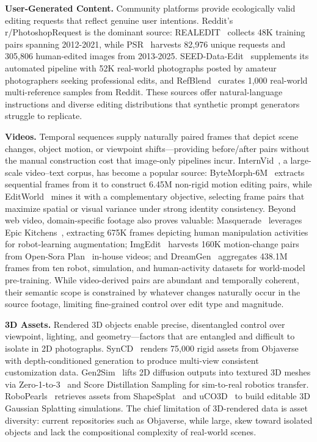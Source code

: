 \documentclass{llmxive}
\begin{document}
\textbf{User-Generated Content.}
Community platforms provide ecologically valid editing requests that reflect genuine user intentions. Reddit's r/PhotoshopRequest is the dominant source: REALEDIT~\citep{sushko2025realedit} collects 48K training pairs spanning 2012-2021, while PSR~\citep{taesiri2025understanding} harvests 82,976 unique requests and 305,806 human-edited images from 2013-2025. SEED-Data-Edit~\citep{ge2024seed} supplements its automated pipeline with 52K real-world photographs posted by amateur photographers seeking professional edits, and RefBlend~\citep{chen2025multiref} curates 1,000 real-world multi-reference samples from Reddit. These sources offer natural-language instructions and diverse editing distributions that synthetic prompt generators struggle to replicate.

\textbf{Videos.}
Temporal sequences supply naturally paired frames that depict scene changes, object motion, or viewpoint shifts---providing before/after pairs without the manual construction cost that image-only pipelines incur. InternVid~\citep{wang2023internvid}, a large-scale video--text corpus, has become a popular source: ByteMorph-6M~\citep{chang2025bytemorph} extracts sequential frames from it to construct 6.45M non-rigid motion editing pairs, while EditWorld~\citep{zeng2025editworld} mines it with a complementary objective, selecting frame pairs that maximize spatial or visual variance under strong identity consistency. Beyond web video, domain-specific footage also proves valuable: Masquerade~\citep{lepert2025masquerade} leverages Epic Kitchens~\citep{damen2018scaling}, extracting 675K frames depicting human manipulation activities for robot-learning augmentation; ImgEdit~\citep{ye2025imgedit} harvests 160K motion-change pairs from Open-Sora Plan~\citep{zheng2024open} in-house videos; and DreamGen~\citep{jang2025dreamgen} aggregates 438.1M frames from ten robot, simulation, and human-activity datasets for world-model pre-training. While video-derived pairs are abundant and temporally coherent, their semantic scope is constrained by whatever changes naturally occur in the source footage, limiting fine-grained control over edit type and magnitude.

\textbf{3D Assets.}
Rendered 3D objects enable precise, disentangled control over viewpoint, lighting, and geometry---factors that are entangled and difficult to isolate in 2D photographs. SynCD~\citep{kumari2025generating} renders 75,000 rigid assets from Objaverse~\citep{deitke2023objaverse} with depth-conditioned generation to produce multi-view consistent customization data. Gen2Sim~\citep{katara2024gen2sim} lifts 2D diffusion outputs into textured 3D meshes via Zero-1-to-3~\citep{liu2023zero} and Score Distillation Sampling for sim-to-real robotics transfer. RoboPearls~\citep{tao2025robopearls} retrieves assets from ShapeSplat~\citep{ma2024shapesplat} and uCO3D~\citep{liu24uco3d} to build editable 3D Gaussian Splatting simulations. The chief limitation of 3D-rendered data is asset diversity: current repositories such as Objaverse, while large, skew toward isolated objects and lack the compositional complexity of real-world scenes.
\end{document}
